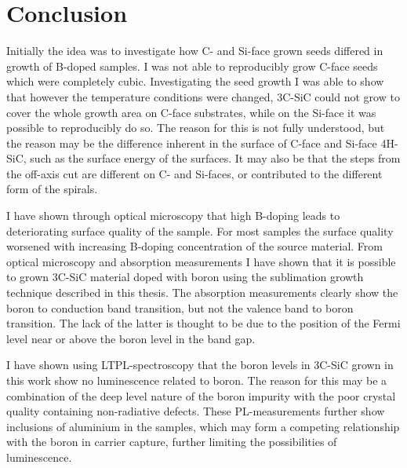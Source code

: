 
\chapter{Conclusion}
Initially the idea was to investigate how C- and Si-face grown seeds differed in growth of B-doped samples. I was not able to reproducibly grow C-face seeds which were completely cubic. Investigating the seed growth I was able to show that however the temperature conditions were changed, 3C-SiC could not grow to cover the whole growth area on C-face substrates, while on the Si-face it was possible to reproducibly do so. The reason for this is not fully understood, but the reason may be the difference inherent in the surface of C-face and Si-face 4H-SiC, such as the surface energy of the surfaces. It may also be that the steps from the off-axis cut are different on C- and Si-faces, or contributed to the different form of the spirals. 

I have shown through optical microscopy that high B-doping leads to deteriorating surface quality of the sample. For most samples the surface quality worsened with increasing B-doping concentration of the source material. From optical microscopy and absorption measurements I have shown that it is possible to grown 3C-SiC material doped with boron using the sublimation growth technique described in this thesis. The absorption measurements clearly show the boron to conduction band transition, but not the valence band to boron transition. The lack of the latter is thought to be due to the position of the Fermi level near or above the boron level in the band gap. 

I have shown using LTPL-spectroscopy that the boron levels in 3C-SiC grown in this work show no luminescence related to boron. The reason for this may be a combination of the deep level nature of the boron impurity with the poor crystal quality containing non-radiative defects. These PL-measurements further show inclusions of aluminium in the samples, which may form a competing relationship with the boron in carrier capture, further limiting the possibilities of luminescence. 